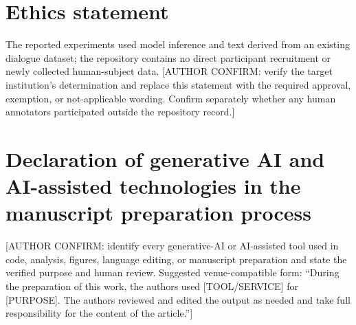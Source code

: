 \section*{Ethics statement}
The reported experiments used model inference and text derived from an existing dialogue dataset; the repository contains no direct participant recruitment or newly collected human-subject data. [AUTHOR CONFIRM: verify the target institution's determination and replace this statement with the required approval, exemption, or not-applicable wording. Confirm separately whether any human annotators participated outside the repository record.]

\section*{Declaration of generative AI and AI-assisted technologies in the manuscript preparation process}
[AUTHOR CONFIRM: identify every generative-AI or AI-assisted tool used in code, analysis, figures, language editing, or manuscript preparation and state the verified purpose and human review. Suggested venue-compatible form: ``During the preparation of this work, the authors used [TOOL/SERVICE] for [PURPOSE]. The authors reviewed and edited the output as needed and take full responsibility for the content of the article.'']
